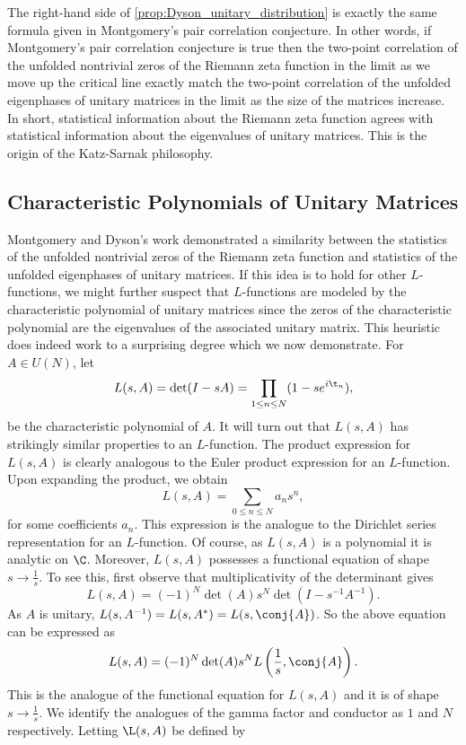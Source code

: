       The right-hand side of \cref{prop:Dyson_unitary_distribution} is exactly the same formula given in Montgomery's pair correlation conjecture. In other words, if Montgomery's pair correlation conjecture is true then the two-point correlation of the unfolded nontrivial zeros of the Riemann zeta function in the limit as we move up the critical line exactly match the two-point correlation of the unfolded eigenphases of unitary matrices in the limit as the size of the matrices increase. In short, statistical information about the Riemann zeta function agrees with statistical information about the eigenvalues of unitary matrices. This is the origin of the Katz-Sarnak philosophy.
    \subsection*{Characteristic Polynomials of Unitary Matrices}
      Montgomery and Dyson's work demonstrated a similarity between the statistics of the unfolded nontrivial zeros of the Riemann zeta function and statistics of the unfolded eigenphases of unitary matrices. If this idea is to hold for other $L$-functions, we might further suspect that $L$-functions are modeled by the characteristic polynomial of unitary matrices since the zeros of the characteristic polynomial are the eigenvalues of the associated unitary matrix. This heuristic does indeed work to a surprising degree which we now demonstrate. For $A \in U(N)$, let
      \[
        L(s,A) = \det(I-sA) = \prod_{1 \le n \le N}(1-se^{i\t_{n}}),
      \]
      be the characteristic polynomial of $A$. It will turn out that $L(s,A)$ has strikingly similar properties to an $L$-function. The product expression for $L(s,A)$ is clearly analogous to the Euler product expression for an $L$-function. Upon expanding the product, we obtain
      \[
        L(s,A) = \sum_{0 \le n \le N}a_{n}s^{n},
      \]
      for some coefficients $a_{n}$. This expression is the analogue to the Dirichlet series representation for an $L$-function. Of course, as $L(s,A)$ is a polynomial it is analytic on $\C$. Moreover, $L(s,A)$ possesses a functional equation of shape $s \to \frac{1}{s}$. To see this, first observe that multiplicativity of the determinant gives
      \[
        L(s,A) = (-1)^{N}\det(A)s^{N}\det(I-s^{-1}A^{-1}).
      \]
      As $A$ is unitary, $L(s,A^{-1}) = L(s,A^{\ast}) = L(s,\conj{A})$. So the above equation can be expressed as
      \[
        L(s,A) = (-1)^{N}\det(A)s^{N}L\left(\frac{1}{s},\conj{A}\right).
      \]
      This is the analogue of the functional equation for $L(s,A)$ and it is of shape $s \to \frac{1}{s}$. We identify the analogues of the gamma factor and conductor as $1$ and $N$ respectively. Letting $\L(s,A)$ be defined by
